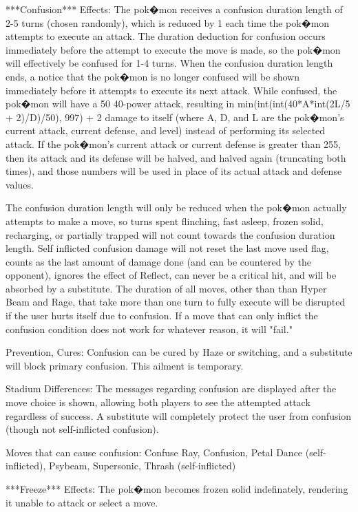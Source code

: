 \documentclass[reprint, aps, prl, paper=A4]{revtex4-1}
\begin{document}
***Confusion***
Effects: The pok�mon receives a confusion duration length of 2-5 turns (chosen randomly), which
is reduced by 1 each time the pok�mon attempts to execute an attack. The duration deduction for
confusion occurs immediately before the attempt to execute the move is made, so the pok�mon
will effectively be confused for 1-4 turns. When the confusion duration length ends, a notice
that the pok�mon is no longer confused will be shown immediately before it attempts to execute
its next attack. While confused, the pok�mon will have a 50%
40-power attack, resulting in min(int(int(40*A*int(2L/5 + 2)/D)/50), 997) + 2 damage to itself
(where A, D, and L are the pok�mon's current attack, current defense, and level) instead of
performing its selected attack. If the pok�mon's current attack or current defense is greater
than 255, then its attack and its defense will be halved, and halved again (truncating both
times), and those numbers will be used in place of its actual attack and defense values.

The confusion duration length will only be reduced when the pok�mon actually attempts to make a
move, so turns spent flinching, fast asleep, frozen solid, recharging, or partially trapped
will not count towards the confusion duration length. Self inflicted confusion damage will not
reset the last move used flag, counts as the last amount of damage done (and can be countered
by the opponent), ignores the effect of Reflect, can never be a critical hit, and will be
absorbed by a substitute. The duration of all moves, other than than Hyper Beam and Rage, that
take more than one turn to fully execute will be disrupted if the user hurts itself due to
confusion. If a move that can only inflict the confusion condition does not work for whatever
reason, it will "fail."

Prevention, Cures: Confusion can be cured by Haze or switching, and a substitute will block
primary confusion. This ailment is temporary.

Stadium Differences: The messages regarding confusion are displayed after the move choice is
shown, allowing both players to see the attempted attack regardless of success. A substitute
will completely protect the user from confusion (though not self-inflicted confusion).

Moves that can cause confusion: Confuse Ray, Confusion, Petal Dance (self-inflicted), Psybeam,
          Supersonic, Thrash (self-inflicted)


***Freeze***
Effects: The pok�mon becomes frozen solid indefinately, rendering it unable to attack or select
a move.
\end{document}
